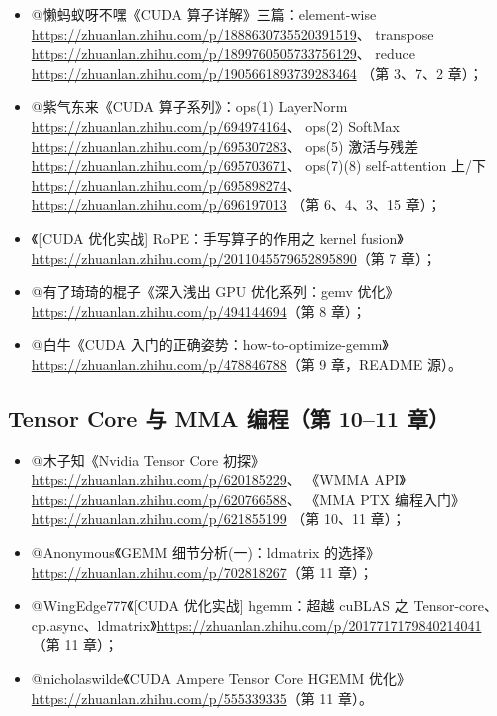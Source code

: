 \begin{itemize}
  \item @懒蚂蚁呀不嘿《CUDA 算子详解》三篇：element-wise
        \url{https://zhuanlan.zhihu.com/p/1888630735520391519}、
        transpose \url{https://zhuanlan.zhihu.com/p/1899760505733756129}、
        reduce \url{https://zhuanlan.zhihu.com/p/1905661893739283464}
        （第 3、7、2 章）；
  \item @紫气东来《CUDA 算子系列》：ops(1) LayerNorm
        \url{https://zhuanlan.zhihu.com/p/694974164}、
        ops(2) SoftMax \url{https://zhuanlan.zhihu.com/p/695307283}、
        ops(5) 激活与残差 \url{https://zhuanlan.zhihu.com/p/695703671}、
        ops(7)(8) self-attention 上/下
        \url{https://zhuanlan.zhihu.com/p/695898274}、
        \url{https://zhuanlan.zhihu.com/p/696197013}
        （第 6、4、3、15 章）；
  \item 《[CUDA 优化实战] RoPE：手写算子的作用之 kernel fusion》
        \url{https://zhuanlan.zhihu.com/p/2011045579652895890}（第 7 章）；
  \item @有了琦琦的棍子《深入浅出 GPU 优化系列：gemv 优化》
        \url{https://zhuanlan.zhihu.com/p/494144694}（第 8 章）；
  \item @白牛《CUDA 入门的正确姿势：how-to-optimize-gemm》
        \url{https://zhuanlan.zhihu.com/p/478846788}（第 9 章，README 源）。
\end{itemize}

\subsection{Tensor Core 与 MMA 编程（第 10--11 章）}

\begin{itemize}
  \item @木子知《Nvidia Tensor Core 初探》\url{https://zhuanlan.zhihu.com/p/620185229}、
        《WMMA API》\url{https://zhuanlan.zhihu.com/p/620766588}、
        《MMA PTX 编程入门》\url{https://zhuanlan.zhihu.com/p/621855199}
        （第 10、11 章）；
  \item @Anonymous《GEMM 细节分析(一)：ldmatrix 的选择》
        \url{https://zhuanlan.zhihu.com/p/702818267}（第 11 章）；
  \item @WingEdge777《[CUDA 优化实战] hgemm：超越 cuBLAS 之 Tensor-core、
        cp.async、ldmatrix》\url{https://zhuanlan.zhihu.com/p/2017717179840214041}
        （第 11 章）；
  \item @nicholaswilde《CUDA Ampere Tensor Core HGEMM 优化》
        \url{https://zhuanlan.zhihu.com/p/555339335}（第 11 章）。
\end{itemize}

